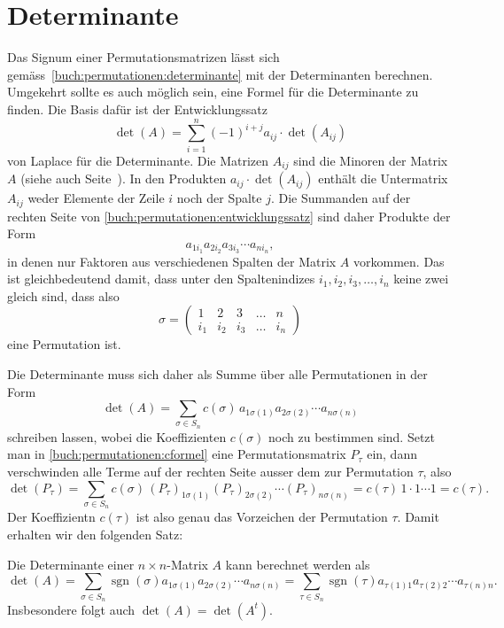 %
%
%
\section{Determinante
\label{buch:section:determinante}}
Das Signum einer Permutationsmatrizen lässt sich
gemäss~\eqref{buch:permutationen:determinante}
mit der Determinanten berechnen.
Umgekehrt sollte es auch möglich sein, eine Formel
für die Determinante zu finden.
Die Basis dafür ist der
Entwicklungssatz 
\begin{equation}
\det(A)
=
\sum_{i=1}^n (-1)^{i+j} a_{i\!j} \cdot \det(A_{i\!j})
\label{buch:permutationen:entwicklungssatz}
\end{equation}
von Laplace für die Determinante.
%
%
Die Matrizen $A_{i\!j}$ sind die Minoren der Matrix $A$
(siehe auch Seite~\pageref{buch:linear:def:minor}).
In den Produkten $a_{i\!j}\cdot\det(A_{i\!j})$ enthält 
die Untermatrix $A_{i\!j}$ weder Elemente der Zeile $i$ noch der 
Spalte $j$.
Die Summanden auf der rechten Seite von
\eqref{buch:permutationen:entwicklungssatz}
sind daher Produkte der Form
\[
a_{1i_1}
a_{2i_2}
a_{3i_3}
\cdots
a_{ni_n},
\]
in denen nur Faktoren aus verschiedenen Spalten der Matrix $A$
vorkommen.
Das ist gleichbedeutend damit, dass unter den Spaltenindizes
$i_1,i_2,i_3,\dots,i_n$ keine zwei gleich sind, dass also
\[
\sigma
=
\begin{pmatrix}
1&2&3&\dots&n\\
i_1&i_2&i_3&\dots&i_n
\end{pmatrix}
\]
eine Permutation ist.

Die Determinante muss sich daher als Summe über alle Permutationen
in der Form
\begin{equation}
\det(A)
=
\sum_{\sigma\in S_n} 
c(\sigma)
\,
a_{1\sigma(1)}
a_{2\sigma(2)}
\cdots
a_{n\sigma(n)}
\label{buch:permutationen:cformel}
\end{equation}
schreiben lassen, wobei die Koeffizienten $c(\sigma)$ noch zu bestimmen
sind.
Setzt man in
\eqref{buch:permutationen:cformel}
eine Permutationsmatrix $P_\tau$ ein, dann verschwinden alle
Terme auf der rechten Seite ausser dem zur Permutation $\tau$,
also
\[
\det(P_\tau)
=
\sum_{\sigma \in S_n}
c(\sigma)
\,
(P_\tau)_{1\sigma(1)}
(P_\tau)_{2\sigma(2)}
\cdots
(P_\tau)_{n\sigma(n)}
=
c(\tau)
\,
1\cdot 1\cdots 1
=
c(\tau).
\]
Der Koeffizientn $c(\tau)$ ist also genau das Vorzeichen
der Permutation $\tau$.
Damit erhalten wir den folgenden Satz:

\begin{satz}
Die Determinante einer $n\times n$-Matrix $A$ kann berechnet werden als
\[
\det(A)
=
\sum_{\sigma\in S_n}
\operatorname{sgn}(\sigma)
a_{1\sigma(1)}
a_{2\sigma(2)}
\cdots
a_{n\sigma(n)}
=
\sum_{\tau\in S_n}
\operatorname{sgn}(\tau)
a_{\tau(1)1}
a_{\tau(2)2}
\cdots
a_{\tau(n)n}.
\]
Insbesondere folgt auch $\det(A)=\det(A^t)$.
\end{satz}

